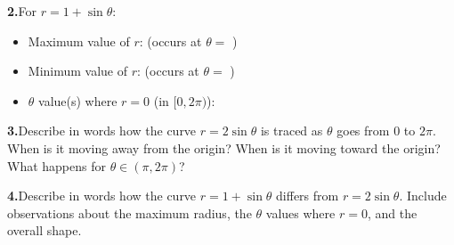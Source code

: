 \documentclass[10pt]{article}
\begin{document}
\begin{tcolorbox}[colback=white, colframe=black!40,
    title=\textbf{Tier E --- Extend},
    fonttitle=\bfseries, arc=2mm, left=3mm, right=3mm, top=2mm, bottom=2mm]
\vspace{4pt}
\textbf{2.}\quad For $r = 1 + \sin\theta$:
\begin{itemize}[leftmargin=1.4em, itemsep=2pt]
  \item Maximum value of $r$: \underline{\hspace{1.5cm}} (occurs at $\theta = $ \underline{\hspace{1.2cm}})
  \item Minimum value of $r$: \underline{\hspace{1.5cm}} (occurs at $\theta = $ \underline{\hspace{1.2cm}})
  \item $\theta$ value(s) where $r = 0$ (in $[0, 2\pi)$): \underline{\hspace{3cm}}
\end{itemize}

\vspace{6pt}
\textbf{3.}\quad Describe in words how the curve $r = 2\sin\theta$ is traced as
$\theta$ goes from $0$ to $2\pi$. When is it moving away from the origin? When
is it moving toward the origin? What happens for $\theta \in (\pi, 2\pi)$?


\vspace{6pt}
\textbf{4.}\quad Describe in words how the curve $r = 1 + \sin\theta$ differs
from $r = 2\sin\theta$. Include observations about the maximum radius, the
$\theta$ values where $r = 0$, and the overall shape.


\end{tcolorbox}
\end{document}

